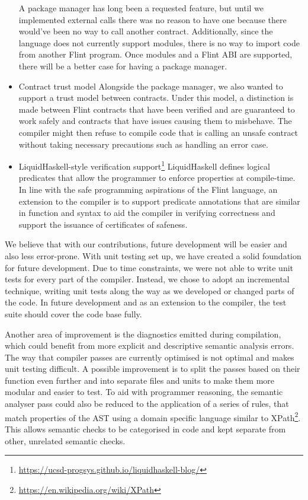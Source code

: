 \begin{itemize}
A package manager has long been a requested feature, but until we implemented external calls there was no reason to have one because there would've been no way to call another contract. Additionally, since the language does not currently support modules, there is no way to import code from another Flint program. Once modules and a Flint ABI are supported, there will be a better case for having a package manager.
	\item Contract trust model
Alongside the package manager, we also wanted to support a trust model between contracts. Under this model, a distinction is made between Flint contracts that have been verified and are guaranteed to work safely and contracts that have issues causing them to misbehave. The compiler might then refuse to compile code that is calling an unsafe contract without taking necessary precautions such as handling an error case.
	\item LiquidHaskell-style verification support\footnote{\url{https://ucsd-progsys.github.io/liquidhaskell-blog/}}
LiquidHaskell defines logical predicates that allow the programmer to enforce properties at compile-time. In line with the safe programming aspirations of the Flint language, an extension to the compiler is to support predicate annotations that are similar in function and syntax to aid the compiler in verifying correctness and support the issuance of certificates of safeness.
\end{itemize}

We believe that with our contributions, future development will be easier and also less error-prone. With unit testing set up, we have created a solid foundation for future development. Due to time constraints, we were not able to write unit tests for every part of the compiler. Instead, we chose to adopt an incremental technique, writing unit tests along the way as we developed or changed parts of the code. In future development and as an extension to the compiler, the test suite should cover the code base fully.

Another area of improvement is the diagnostics emitted during compilation, which could benefit from more explicit and descriptive semantic analysis errors. The way that compiler passes are currently optimised is not optimal and makes unit testing difficult. A possible improvement is to split the passes based on their function even further and into separate files and units to make them more modular and easier to test. To aid with programmer reasoning, the semantic analyser pass could also be reduced to the application of a series of rules, that match properties of the AST using a domain specific language similar to XPath\footnote{\url{https://en.wikipedia.org/wiki/XPath}}. This allows semantic checks to be categorised in code and kept separate from other, unrelated semantic checks.

